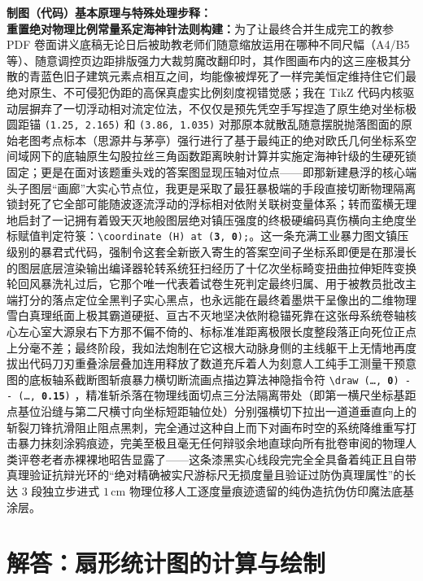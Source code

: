 \documentclass[12pt, a4paper]{ctexrep}
\begin{document}
{\small\color{blue!70!black}
\textbf{制图（代码）基本原理与特殊处理步释：}\\
\textbf{重置绝对物理比例常量系定海神针法则构建：}为了让最终合并生成完工的教参 PDF 卷面讲义底稿无论日后被助教老师们随意缩放运用在哪种不同尺幅（A4/B5 等）、随意调控页边距排版强力大裁剪魔改翻印时，其作图画布内的这三座极其分散的青蓝色旧子建筑元素点相互之间，均能像被焊死了一样完美恒定维持住它们最绝对原生、不可侵犯伪距的高保真虚实比例刻度视错觉感；我在 TikZ 代码内核驱动层摒弃了一切浮动相对流定位法，不仅仅是预先凭空手写捏造了原生绝对坐标极圆距锚 \texttt{(1.25, 2.165)} 和 \texttt{(3.86, 1.035)} 对那原本就散乱随意摆脱抛落图面的原始老图考点标本（思源井与茅亭）强行进行了基于最纯正的绝对欧氏几何坐标系空间域网下的底轴原生勾股拉丝三角函数距离映射计算并实施定海神针级的生硬死锁固定；更是在面对该题重头戏的答案图显现压轴对位点——即那新建悬浮的核心端头子图层“画廊”大实心节点位，我更是采取了最狂暴极端的手段直接切断物理隔离锁封死了它全部可能随波逐流浮动的浮标相对依附关联树变量体系；转而蛮横无理地启封了一记拥有着毁天灭地般图层绝对镇压强度的终极硬编码真伤横向主绝度坐标赋值判定符箓：\texttt{\textbackslash coordinate (H) at (\textbf{3}, \textbf{0});}。这一条充满工业暴力图文镇压级别的暴君式代码，强制令这套全新嵌入寄生的答案空间子坐标系即便是在那漫长的图层底层渲染输出编译器轮转系统狂扫经历了十亿次坐标畸变扭曲拉伸矩阵变换轮回风暴洗礼过后，它那个唯一代表着试卷生死判定最终归属、用于被教员批改主端打分的落点定位全黑判子实心黑点，也永远能在最终着墨烘干呈像出的二维物理雪白真理纸面上极其霸道硬挺、亘古不灭地坚决依附稳锚死靠在这张母系统卷轴核心左心室大源泉右下方那不偏不倚的、标标准准距离极限长度整段落正向死位正点上分毫不差；最终阶段，我如法炮制在它这根大动脉身侧的主线躯干上无情地再度拔出代码刀刃重叠涂层叠加连用释放了数道充斥着人为刻意人工纯手工测量干预意图的底板轴系截断图斩痕暴力横切断流画点描边算法神隐指令符 \texttt{\textbackslash draw (\dots, \textbf{0}) -{}- (\dots, \textbf{0.15})} ，精准斩杀落在物理线面切点三分法隔离带处（即第一横尺坐标基距点基位沿缝与第二尺横寸向坐标短距轴位处）分别强横切下拉出一道道垂直向上的斩裂刀锋抗滑阻止阻点黑刺，完全通过这种自上而下对画布时空的系统降维重写打击暴力抹刻涂鸦痕迹，完美至极且毫无任何辩驳余地直球向所有批卷审阅的物理人类评卷老者赤裸裸地昭告显露了——这条漆黑实心线段完完全全具备着纯正且自带真理验证抗辩光环的“绝对精确被实尺游标尺无损度量且验证过防伪真理属性”的长达 $3$ 段独立步进式 $1\,\text{cm}$ 物理位移人工逐度量痕迹遗留的纯伪造抗伪仿印魔法底基涂层。
}

\newpage

\section{解答：扇形统计图的计算与绘制}
\end{document}
